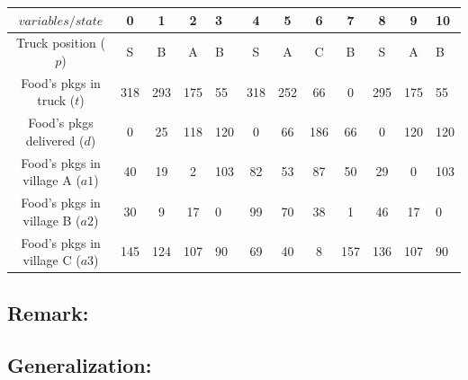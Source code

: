 \begin{description}
\begin{center}
\begin{tabular}{|c|c|c|c|a|c|c|c|c|c|c|a|}
  \hline
  $variables/state$ & 0 & 1 & 2 & 3 & 4 & 5 & 6 & 7 & 8 & 9 & 10  \\
  \hline
  Truck position ($p$) & S & B & A & B & S & A & C & B & S & A & B\\
  Food's pkgs in truck ($t$) & 318 & 293 & 175 & 55 & 318 & 252 & 66 & 0 & 295 & 175 & 55\\
  Food's pkgs delivered ($d$) & 0 & 25 & 118 & 120 & 0 & 66 & 186 & 66 & 0 & 120 & 120\\
  Food's pkgs in village A ($a1$) & 40  & 19  & 2   & 103 & 82 & 53 & 87 & 50  & 29  & 0   & 103 \\
  Food's pkgs in village B ($a2$) & 30  & 9   & 17  & 0   & 99 & 70 & 38 & 1   & 46  & 17  & 0  \\
  Food's pkgs in village C ($a3$) & 145 & 124 & 107 & 90  & 69 & 40 & 8  & 157 & 136 & 107 & 90  \\
  \hline
\end{tabular}
\end{center}
  
\end{description}


\subsection*{Remark:}


\subsection*{Generalization:}




